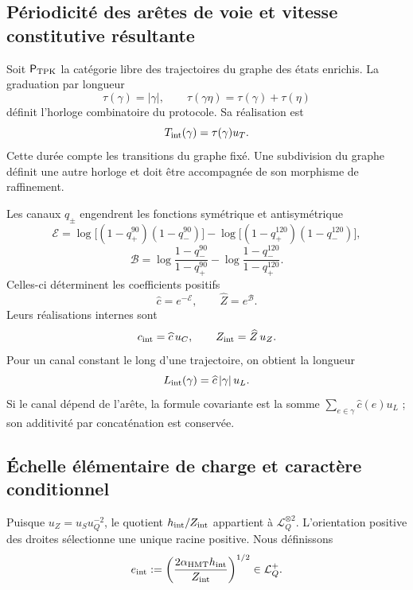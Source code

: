 \subsection{Périodicité des arêtes de voie et vitesse constitutive résultante}

Soit \(\mathsf P_{\rm TPK}\) la catégorie libre des trajectoires du graphe des
états enrichis. La graduation par longueur
\[
 \tau(\gamma)=|\gamma|,
 \qquad
 \tau(\gamma\eta)=\tau(\gamma)+\tau(\eta)
\]
définit l'horloge combinatoire du protocole. Sa réalisation est
\[
 T_{\rm int}(\gamma)=\tau(\gamma)u_T.
\]
Cette durée compte les transitions du graphe fixé. Une subdivision du graphe
définit une autre horloge et doit être accompagnée de son morphisme de raffinement.

Les canaux \(q_\pm\) engendrent les fonctions symétrique et antisymétrique
\[
 \mathcal E=
 \log\!\bigl[(1-q_+^{90})(1-q_-^{90})\bigr]
 -\log\!\bigl[(1-q_+^{120})(1-q_-^{120})\bigr],
\]
\[
 \mathcal B=
 \log\!\frac{1-q_-^{90}}{1-q_+^{90}}
 -\log\!\frac{1-q_-^{120}}{1-q_+^{120}}.
\]
Celles-ci déterminent
les coefficients positifs
\[
 \widehat c=e^{-\mathcal E},
 \qquad \widehat Z=e^{\mathcal B}.
\]
Leurs réalisations internes sont
\begin{equation}
 c_{\rm int}=\widehat c\,u_C,
 \qquad Z_{\rm int}=\widehat Z\,u_Z.
 \label{eq:cZ-internos}
\end{equation}
Pour un canal constant le long d'une trajectoire, on obtient la longueur
\begin{equation}
 L_{\rm int}(\gamma)
 =\widehat c\,|\gamma|\,u_L.
 \label{eq:longitud-ruta}
\end{equation}
Si le canal dépend de l'arête, la formule covariante est la somme
\(\sum_{e\in\gamma}\widehat c(e)u_L\) ; son additivité par concaténation est
conservée.

\subsection{Échelle élémentaire de charge et caractère conditionnel}

Puisque \(u_Z=u_Su_Q^{-2}\), le quotient
\(h_{\rm int}/Z_{\rm int}\) appartient à \(\mathcal L_Q^{\otimes2}\).
L'orientation positive des droites sélectionne une unique racine positive.
Nous définissons
\begin{equation}
 e_{\rm int}
 :=\left(\frac{2\alpha_{\rm HMT}h_{\rm int}}
 {Z_{\rm int}}\right)^{1/2}\in\mathcal L_Q^+.
 \label{eq:carga-interna}
\end{equation}

